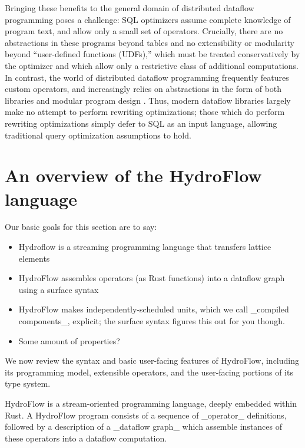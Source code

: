 Bringing these benefits to the general domain of distributed dataflow programming poses a challenge: SQL optimizers assume complete knowledge of program text, and allow only a small set of operators.  Crucially, there are no abstractions in these programs beyond tables and no extensibility or modularity beyond ``user-defined functions (UDFs),'' which must be treated conservatively by the optimizer and which allow only a restrictive class of additional computations.  In contrast, the world of distributed dataflow programming frequently features custom operators, and increasingly relies on abstractions in the form of both libraries and modular program design \cite{hope-this-is-true!}. Thus, modern dataflow libraries largely make no attempt to perform rewriting optimizations; those which do perform rewriting optimizations simply defer to SQL as an input language, allowing traditional query optimization assumptions to hold. 

\section{An overview of the HydroFlow language}
\label{sec:hydroflow-overview}

Our basic goals for this section are to say: 

\begin{itemize}
\item Hydroflow is a streaming programming language that transfers lattice elements
\item HydroFlow assembles operators (as Rust functions) into a dataflow graph using a surface syntax
\item HydroFlow makes independently-scheduled units, which we call _compiled components_, explicit; the surface syntax figures this out for you though.
\item Some amount of properties?  
\end{itemize}

We now review the syntax and basic user-facing features of HydroFlow, including its programming model, extensible operators, and the user-facing portions of its type system.

HydroFlow is a stream-oriented programming language, deeply embedded within Rust.  A HydroFlow program consists of a sequence of _operator_ definitions, followed by a description of a _dataflow graph_ which assemble instances of these operators into a dataflow computation. 





\endinput
